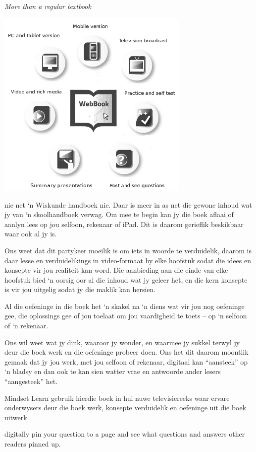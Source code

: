 
\newpage
\thispagestyle{empty}

{\normalfont\sffamily\fontsize{22}\normalfont\itshape More than a regular textbook} \par

\begin{center}
\includegraphics[width=0.70\textwidth]{title_images/morethantextbook.png}
\end{center}

\par
{
\is nie net ‘n Wiskunde handboek nie. Daar is meer in as net die gewone inhoud wat jy van ‘n skoolhandboek verwag. Om mee te begin kan jy die boek aflaai of aanlyn lees op jou selfoon, rekenaar of iPad. Dit is daarom gerieflik beskikbaar waar ook al jy is.\par

Ons weet dat dit partykeer moeilik is om iets in woorde te verduidelik, daarom is daar lesse en verduidelikings in video-formaat by elke hoofstuk sodat die idees en konsepte vir jou realiteit kan word. Die aanbieding aan die einde van elke hoofstuk bied ‘n oorsig oor al die inhoud wat jy geleer het, en die kern konsepte is vir jou uitgelig sodat jy die maklik kan hersien. \par

Al die oefeninge in die boek het ‘n skakel na ‘n diens wat vir jou nog oefeninge gee, die oplossings gee of jou toelaat om jou vaardigheid te toets – op ‘n selfoon of ‘n rekenaar. \par

Ons wil weet wat jy dink, waaroor jy wonder, en waarmee jy sukkel terwyl jy deur die boek werk en die oefeninge probeer doen. Ons het dit daarom moontlik gemaak dat jy jou werk, met jou selfoon of rekenaar, digitaal kan “aansteek” op ‘n bladsy en dan ook te kan sien watter vrae en antwoorde ander lesers “aangesteek” het. \par

Mindset Learn gebruik hierdie boek in hul nuwe televisiereeks waar ervare onderwysers deur die boek werk, konsepte verduidelik en oefeninge uit die boek uitwerk.}
digitally pin your question to a page and see what questions and answers other readers pinned up.\par


